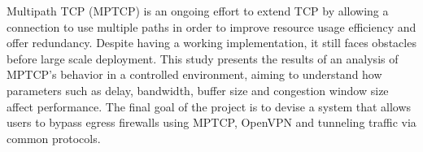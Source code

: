 Multipath TCP (MPTCP) is an ongoing effort to extend TCP by allowing a connection to use multiple paths in order to improve resource usage efficiency and offer redundancy. Despite having a working implementation, it still faces obstacles before large scale deployment. This study presents the results of an analysis of MPTCP's behavior in a controlled environment, aiming to understand how parameters such as delay, bandwidth, buffer size and congestion window size affect performance. The final goal of the project is to devise a system that allows users to bypass egress firewalls using MPTCP, OpenVPN and tunneling traffic via common protocols.
